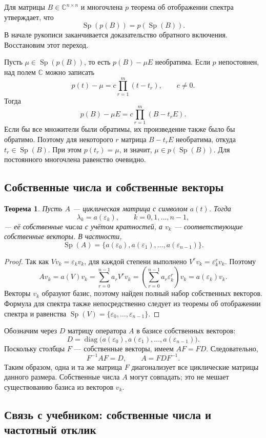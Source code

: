 \documentclass[12pt,a4paper]{article}
\newtheorem{theorem}{Теорема}
\theoremstyle{definition}
\theoremstyle{remark}
\DeclareMathOperator{\Sp}{Sp}
\DeclareMathOperator{\diag}{diag}
\newcommand{\CC}{\mathbb{C}}
\newcommand{\eps}{\varepsilon}
\begin{document}
Для матрицы $B\in\CC^{n\times n}$ и многочлена $p$ теорема об отображении
спектра утверждает, что
\[
  \Sp(p(B))=p(\Sp(B)).
\]
В начале рукописи заканчивается доказательство обратного включения.
Восстановим этот переход.

Пусть $\mu\in\Sp(p(B))$, то есть $p(B)-\mu E$ необратима. Если $p$
непостоянен, над полем $\CC$ можно записать
\[
  p(t)-\mu=c\prod_{r=1}^{m}(t-t_r),\qquad c\ne0.
\]
Тогда
\[
  p(B)-\mu E=c\prod_{r=1}^{m}(B-t_rE).
\]
Если бы все множители были обратимы, их произведение также было бы
обратимо. Поэтому для некоторого $r$ матрица $B-t_rE$ необратима,
откуда $t_r\in\Sp(B)$. При этом $p(t_r)=\mu$, и значит,
$\mu\in p(\Sp(B))$. Для постоянного многочлена равенство очевидно.

\subsection{Собственные числа и собственные векторы}

\begin{theorem}
Пусть $A$ --- циклическая матрица с символом $a(t)$. Тогда
\[
  \lambda_k=a(\eps_k),\qquad k=0,1,\dots,n-1,
\]
--- её собственные числа с учётом кратностей, а $v_k$ --- соответствующие
собственные векторы. В частности,
\[
  \Sp(A)=\{a(\eps_0),a(\eps_1),\dots,a(\eps_{n-1})\}.
\]
\end{theorem}

\begin{proof}
Так как $Vv_k=\eps_kv_k$, для каждой степени выполнено
$V^rv_k=\eps_k^rv_k$. Поэтому
\[
  Av_k=a(V)v_k
  =\sum_{r=0}^{n-1}a_rV^rv_k
  =\left(\sum_{r=0}^{n-1}a_r\eps_k^r\right)v_k
  =a(\eps_k)v_k.
\]
Векторы $v_k$ образуют базис, поэтому найден полный набор собственных
векторов. Формула для спектра также непосредственно следует из теоремы
об отображении спектра и равенства $\Sp(V)=\{\eps_0,\dots,\eps_{n-1}\}$.
\end{proof}

Обозначим через $D$ матрицу оператора $A$ в базисе собственных векторов:
\[
  D=\diag\bigl(a(\eps_0),a(\eps_1),\dots,a(\eps_{n-1})\bigr).
\]
Поскольку столбцы $F$ --- собственные векторы, имеем $AF=FD$. Следовательно,
\[
  \boxed{F^{-1}AF=D},\qquad
  \boxed{A=FDF^{-1}}.
\]
Таким образом, одна и та же матрица $F$ диагонализует все циклические
матрицы данного размера. Собственные числа $A$ могут совпадать; это не
мешает существованию базиса из векторов $v_k$.

\subsection{Связь с учебником: собственные числа и частотный отклик}
\end{document}
